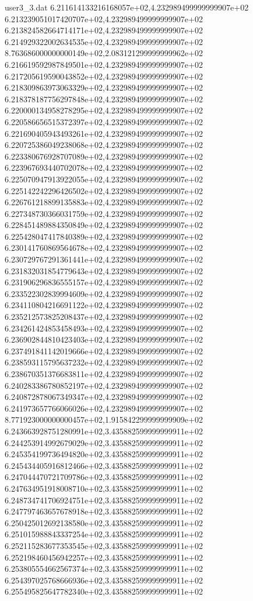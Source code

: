 \begin{filecontents}{user3_3.dat}
6.211614133216168057e+02,4.232989499999999907e+02
6.213239051017420707e+02,4.232989499999999907e+02
6.213824582664714171e+02,4.232989499999999907e+02
6.214929322002634535e+02,4.232989499999999907e+02
8.763686000000000149e+02,2.083121299999999962e+02
6.216619592987849501e+02,4.232989499999999907e+02
6.217205619590043852e+02,4.232989499999999907e+02
6.218309863973063329e+02,4.232989499999999907e+02
6.218378187756297848e+02,4.232989499999999907e+02
6.220000134958278295e+02,4.232989499999999907e+02
6.220586656515372397e+02,4.232989499999999907e+02
6.221690405943493261e+02,4.232989499999999907e+02
6.220725386049238068e+02,4.232989499999999907e+02
6.223380676928707089e+02,4.232989499999999907e+02
6.223967693440702078e+02,4.232989499999999907e+02
6.225070947913922055e+02,4.232989499999999907e+02
6.225142242296426502e+02,4.232989499999999907e+02
6.226761218899135883e+02,4.232989499999999907e+02
6.227348730366031759e+02,4.232989499999999907e+02
6.228451489884350849e+02,4.232989499999999907e+02
6.225428047417840389e+02,4.232989499999999907e+02
6.230141760869564678e+02,4.232989499999999907e+02
6.230729767291361441e+02,4.232989499999999907e+02
6.231832031854779643e+02,4.232989499999999907e+02
6.231906296836555157e+02,4.232989499999999907e+02
6.233522302839994609e+02,4.232989499999999907e+02
6.234110804216691122e+02,4.232989499999999907e+02
6.235212573825208437e+02,4.232989499999999907e+02
6.234261424853458493e+02,4.232989499999999907e+02
6.236902844810423403e+02,4.232989499999999907e+02
6.237491841142019666e+02,4.232989499999999907e+02
6.238593115795637232e+02,4.232989499999999907e+02
6.238670351376683811e+02,4.232989499999999907e+02
6.240283386780852197e+02,4.232989499999999907e+02
6.240872878067349347e+02,4.232989499999999907e+02
6.241973657766066026e+02,4.232989499999999907e+02
8.771923000000000457e+02,1.915842299999999909e+02
6.243663928751280991e+02,3.435882599999999911e+02
6.244253914992679029e+02,3.435882599999999911e+02
6.245354199736494820e+02,3.435882599999999911e+02
6.245434405916812466e+02,3.435882599999999911e+02
6.247044470721709786e+02,3.435882599999999911e+02
6.247634951918008710e+02,3.435882599999999911e+02
6.248734741706924751e+02,3.435882599999999911e+02
6.247797463657678918e+02,3.435882599999999911e+02
6.250425012692138580e+02,3.435882599999999911e+02
6.251015988843337254e+02,3.435882599999999911e+02
6.252115283677353545e+02,3.435882599999999911e+02
6.252198460456942257e+02,3.435882599999999911e+02
6.253805554662567374e+02,3.435882599999999911e+02
6.254397025768666936e+02,3.435882599999999911e+02
6.255495825647782340e+02,3.435882599999999911e+02

\end{filecontents}
